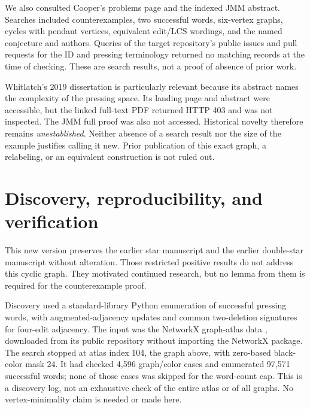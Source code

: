 \documentclass[11pt]{article}
\begin{document}
We also consulted Cooper's problems page \cite{problems} and the indexed
JMM abstract. Searches included counterexamples, two successful words,
six-vertex graphs, cycles with pendant vertices, equivalent edit/LCS
wordings, and the named conjecture and authors. Queries of the target
repository's public issues and pull requests for the ID and pressing
terminology returned no matching records at the time of checking.
These are search results, not a proof of absence of prior work.

Whitlatch's 2019 dissertation \cite{whitlatchthesis} is particularly
relevant because its abstract names the complexity of the pressing space.
Its landing page and abstract were accessible, but the linked full-text
PDF returned HTTP 403 and was not inspected. The JMM full proof was also
not accessed. Historical novelty therefore remains \emph{unestablished}.
Neither absence of a search result nor the size of the example justifies
calling it new. Prior publication of this exact graph, a relabeling, or an
equivalent construction is not ruled out.

\section{Discovery, reproducibility, and verification}
This new version preserves the earlier star manuscript and the earlier
double-star manuscript \cite{priorstar,priordouble} without alteration.
Those restricted positive results do not address this cyclic graph. They
motivated continued research, but no lemma from them is required for the
counterexample proof.

Discovery used a standard-library Python enumeration of successful
pressing words, with augmented-adjacency updates and common two-deletion
signatures for four-edit adjacency. The input was the NetworkX graph-atlas
data \cite{atlas}, downloaded from its public repository without importing
the NetworkX package. The search stopped at atlas index 104, the graph
above, with zero-based black-color mask 24. It had checked 4,596
graph/color cases and enumerated 97,571 successful words; none of those
cases was skipped for the word-count cap. This is a discovery log,
not an exhaustive check of the entire atlas or of all graphs. No
vertex-minimality claim is needed or made here.
\end{document}
